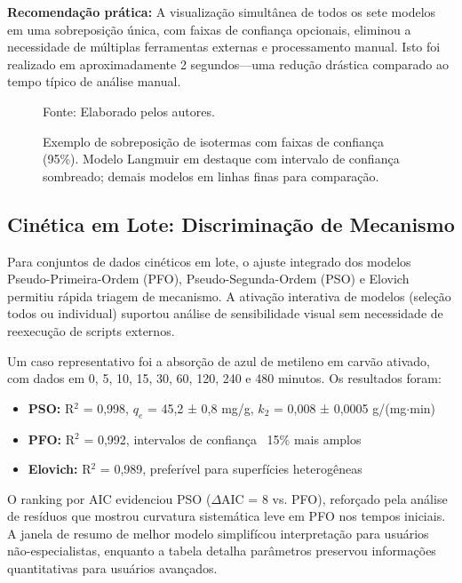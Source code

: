 \documentclass[openany, a4paper, twoside]{article}
\begin{document}
\noindent \textbf{Recomendação prática:} A visualização simultânea de todos os sete modelos em uma sobreposição única, com faixas de confiança opcionais, eliminou a necessidade de múltiplas ferramentas externas e processamento manual. Isto foi realizado em aproximadamente 2 segundos---uma redução drástica comparado ao tempo típico de análise manual.

\begin{figure}[h!]
	\centering
	\caption{Exemplo de sobreposição de isotermas com faixas de confiança (95\%). Modelo Langmuir em destaque com intervalo de confiança sombreado; demais modelos em linhas finas para comparação.}
	Fonte: Elaborado pelos autores.
	\label{fig:equilibrium_overlay}
\end{figure}

\subsection{Cinética em Lote: Discriminação de Mecanismo}

Para conjuntos de dados cinéticos em lote, o ajuste integrado dos modelos Pseudo-Primeira-Ordem (PFO), Pseudo-Segunda-Ordem (PSO) e Elovich permitiu rápida triagem de mecanismo. A ativação interativa de modelos (seleção todos ou individual) suportou análise de sensibilidade visual sem necessidade de reexecução de scripts externos.

Um caso representativo foi a absorção de azul de metileno em carvão ativado, com dados em 0, 5, 10, 15, 30, 60, 120, 240 e 480 minutos. Os resultados foram:

\begin{itemize}
	\item \textbf{PSO:} R$^2$ = 0,998, $q_e$ = 45,2 ± 0,8 mg/g, $k_2$ = 0,008 ± 0,0005 g/(mg$\cdot$min)
	\item \textbf{PFO:} R$^2$ = 0,992, intervalos de confiança ~15\% mais amplos
	\item \textbf{Elovich:} R$^2$ = 0,989, preferível para superfícies heterogêneas
\end{itemize}

O ranking por AIC evidenciou PSO ($\Delta$AIC = 8 vs. PFO), reforçado pela análise de resíduos que mostrou curvatura sistemática leve em PFO nos tempos iniciais. A janela de resumo de melhor modelo simplifícou interpretação para usuários não-especialistas, enquanto a tabela detalha parâmetros preservou informações quantitativas para usuários avançados.
\end{document}
